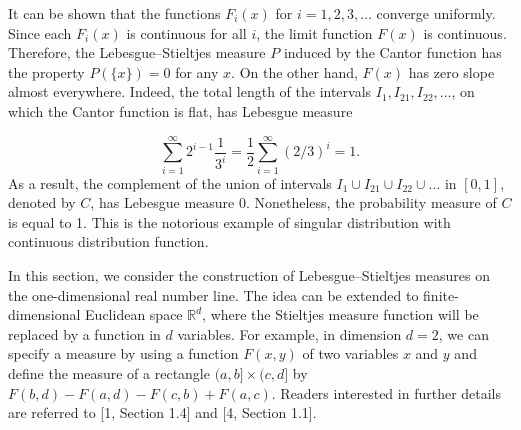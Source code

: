 It can be shown that the functions $F_i(x)$ for $i = 1, 2, 3, \dots$ converge uniformly. Since each $F_i(x)$ is continuous for all $i$, the limit function $F(x)$ is continuous. Therefore, the Lebesgue--Stieltjes measure $P$ induced by the Cantor function has the property $P(\{x\}) = 0$ for any $x$. On the other hand, $F(x)$ has zero slope almost everywhere. Indeed, the total length of the intervals $I_1, I_{21}, I_{22}, \dots$, on which the Cantor function is flat, has Lebesgue measure

\[
\sum_{i=1}^\infty 2^{i-1} \frac{1}{3^i} = \frac{1}{2} \sum_{i=1}^\infty (2/3)^i = 1.
\]
As a result, the complement of the union of intervals $I_1 \cup I_{21} \cup I_{22} \cup \dots$ in $[0, 1]$, denoted by $C$, has Lebesgue measure 0. Nonetheless, the probability measure of $C$ is equal to 1. This is the notorious example of singular distribution with continuous distribution function.

In this section, we consider the construction of Lebesgue--Stieltjes measures on the one-dimensional real number line. The idea can be extended to finite-dimensional Euclidean space $\mathbb{R}^d$, where the Stieltjes measure function will be replaced by a function in $d$ variables. For example, in dimension $d = 2$, we can specify a measure by using a function $F(x, y)$ of two variables $x$ and $y$ and define the measure of a rectangle $(a, b] \times (c, d]$ by $F(b, d) - F(a, d) - F(c, b) + F(a, c)$. Readers interested in further details are referred to [1, Section 1.4] and [4, Section 1.1].